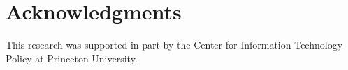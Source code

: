 \section*{Acknowledgments}
This research was supported in part by the Center for Information Technology
Policy at Princeton University.
